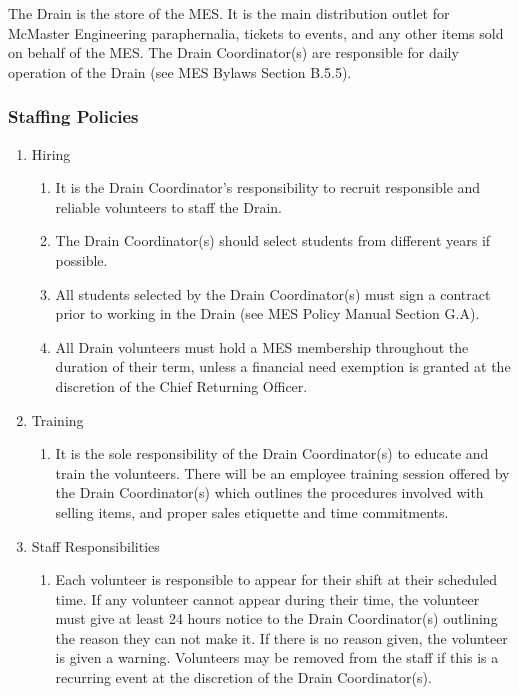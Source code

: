 The Drain is the store of the MES. It is the main distribution outlet
for McMaster Engineering paraphernalia, tickets to events, and any other
items sold on behalf of the MES. The Drain Coordinator(s) are
responsible for daily operation of the Drain (see MES Bylaws Section
B.5.5).

\hypertarget{staffing-policies}{%
 \subsubsection{Staffing Policies}
 \label{staffing-policies}}

\begin{enumerate}
 \item
  Hiring

  \begin{enumerate}
   \item
    It is the Drain Coordinator's responsibility to recruit responsible
    and reliable volunteers to staff the Drain.
   \item
    The Drain Coordinator(s) should select students from different years
    if possible.
   \item
    All students selected by the Drain Coordinator(s) must sign a
    contract prior to working in the Drain (see MES Policy Manual
    Section G.A).
   \item
    All Drain volunteers must hold a MES membership throughout the
    duration of their term, unless a financial need exemption is granted
    at the discretion of the Chief Returning Officer.
  \end{enumerate}
 \item
  Training

  \begin{enumerate}
   \item
    It is the sole responsibility of the Drain Coordinator(s) to educate
    and train the volunteers. There will be an employee training session
    offered by the Drain Coordinator(s) which outlines the procedures
    involved with selling items, and proper sales etiquette and time
    commitments.
  \end{enumerate}
 \item
  Staff Responsibilities

  \begin{enumerate}
   \item
    Each volunteer is responsible to appear for their shift at their
    scheduled time. If any volunteer cannot appear during their time,
    the volunteer must give at least 24 hours notice to the Drain
    Coordinator(s) outlining the reason they can not make it. If there
    is no reason given, the volunteer is given a warning. Volunteers may
    be removed from the staff if this is a recurring event at the
    discretion of the Drain Coordinator(s).
  \end{enumerate}
\end{enumerate}

